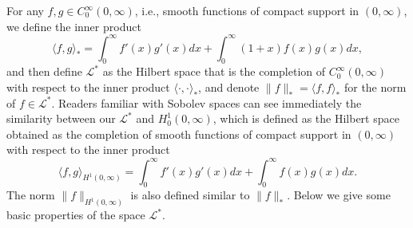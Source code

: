 \documentclass[11pt, a4paper]{article}
\numberwithin{equation}{section}
\newcommand{\ie}{i.e.}
\newcommand{\Lstar}{\mathcal{L}^*}
\theoremstyle{definition}
\theoremstyle{remark}
\begin{document}
For any $f, g \in C^{\infty}_0(0, \infty)$, \ie, smooth functions of compact support in $(0, \infty)$, we define the inner product
\begin{equation}
  \langle f, g \rangle_* = \int^{\infty}_0 f'(x) g'(x) dx + \int^{\infty}_0 (1 + x) f(x) g(x) dx,
\end{equation}
and then define $\Lstar$  as the Hilbert space that is the completion of $C^{\infty}_0(0, \infty)$ with respect to the inner product $\langle \cdot, \cdot \rangle_*$, and denote $\lVert f \rVert_* = \langle f, f \rangle_*$ for the norm of $f \in\Lstar$. Readers familiar with Sobolev spaces can see immediately the similarity between our $\Lstar$ and $H^1_0(0, \infty)$, which is defined as the Hilbert space obtained as the completion of smooth functions of compact support in $(0, \infty)$ with respect to the inner product
\begin{equation}
  \langle f, g \rangle_{H^1(0, \infty)} = \int^{\infty}_0 f'(x) g'(x) dx + \int^{\infty}_0 f(x) g(x) dx.
\end{equation}
The norm $\lVert f \rVert_{H^1(0, \infty)}$ is also defined similar to $\lVert f \rVert_*$. Below we give some basic properties of the space $\Lstar$.
\end{document}
